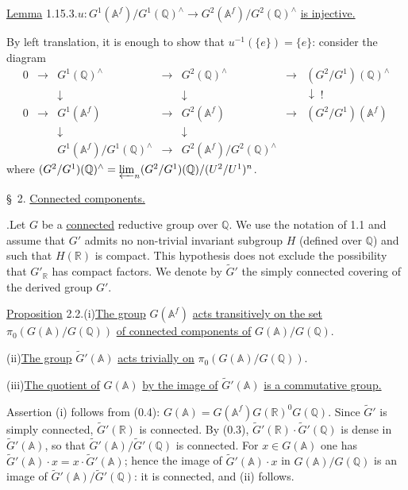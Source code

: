 \documentclass[10pt]{article}
\newcommand{\A}{\mathbb A}
\newcommand{\Af}{\mathbb A^f}
\newcommand{\Q}{\mathbb Q}
\newcommand{\R}{\mathbb R}
\newcommand{\limproj}{\varprojlim}
\begin{document}
\noindent\uline{Lemma} 1.15.3.\quad $u:G^1(\Af)/G^1(\Q)^\wedge\longrightarrow G^2(\Af)/G^2(\Q)^\wedge$ \uline{is injective.}

By left translation, it is enough to show that $u^{-1}(\{e\})=\{e\}$: consider the diagram
\[
\begin{array}{ccccccccc}
0&\longrightarrow&G^1(\Q)^\wedge&\longrightarrow&G^2(\Q)^\wedge&\longrightarrow&(G^2/G^1)(\Q)^\wedge\\
&&\downarrow&&\downarrow&&\downarrow\;{\scriptstyle !}\\
0&\longrightarrow&G^1(\Af)&\longrightarrow&G^2(\Af)&\longrightarrow&(G^2/G^1)(\Af)\\
&&\downarrow&&\downarrow&&\\
&&G^1(\Af)/G^1(\Q)^\wedge&\longrightarrow&G^2(\Af)/G^2(\Q)^\wedge&&
\end{array}
\]
where $(G^2/G^1)(\Q)^\wedge=\limproj_n (G^2/G^1)(\Q)/(U^2/U^1)^n$.

\noindent \S\ 2. \uline{Connected components.}\par\vspace{0.9em}

.\quad Let $G$ be a \uline{connected} reductive group over $\Q$. We use the notation of 1.1 and assume that $G'$ admits no non-trivial invariant subgroup $H$ (defined over $\Q$) and such that $H(\R)$ is compact. This hypothesis does not exclude the possibility that $G'_\R$ has
compact factors. We denote by $\widetilde G'$ the simply connected covering of the derived group $G'$.

\noindent\uline{Proposition} 2.2.\quad (i)\quad \uline{The group} $G(\Af)$ \uline{acts transitively on the set} $\pi_0(G(\A)/G(\Q))$ \uline{of connected components of} $G(\A)/G(\Q)$.
\par\smallskip\noindent\hspace{2.8em}(ii)\quad \uline{The group} $\widetilde G'(\A)$ \uline{acts trivially on} $\pi_0(G(\A)/G(\Q))$.
\par\smallskip\noindent\hspace{2.8em}(iii)\quad \uline{The quotient of} $G(\A)$ \uline{by the image of} $\widetilde G'(\A)$ \uline{is a commutative group.}

Assertion (i) follows from (0.4): $G(\A)=G(\Af)G(\R)^0G(\Q)$.
Since $\widetilde G'$ is simply connected, $\widetilde G'(\R)$ is connected. By (0.3), $\widetilde G'(\R)\cdot\widetilde G'(\Q)$ is dense in $\widetilde G'(\A)$, so that $\widetilde G'(\A)/\widetilde G'(\Q)$ is connected. For $x\in G(\A)$ one has $\widetilde G'(\A)\cdot x=x\cdot\widetilde G'(\A)$; hence the image of $\widetilde G'(\A)\cdot x$ in $G(\A)/G(\Q)$ is an image of $\widetilde G'(\A)/\widetilde G'(\Q)$: it is connected, and (ii) follows.
\end{document}
